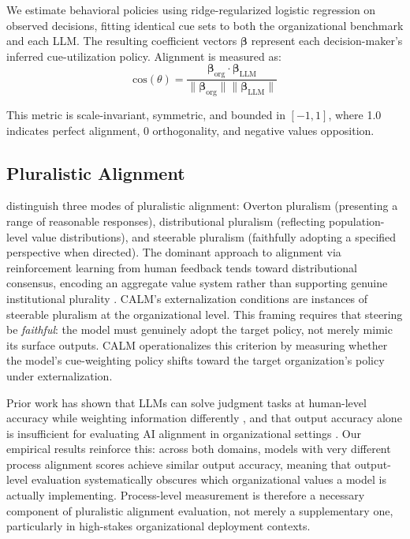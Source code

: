 \documentclass{article}
\begin{document}
We estimate behavioral policies using ridge-regularized logistic regression on observed decisions, fitting identical cue sets to both the organizational benchmark and each LLM. The resulting coefficient vectors $\boldsymbol{\beta}$ represent each decision-maker's inferred cue-utilization policy. Alignment is measured as:
\begin{equation}
  \text{cos}(\theta) = \frac{\boldsymbol{\beta}_{\text{org}} \cdot \boldsymbol{\beta}_{\text{LLM}}}{\|\boldsymbol{\beta}_{\text{org}}\| \|\boldsymbol{\beta}_{\text{LLM}}\|}
\end{equation}

This metric is scale-invariant, symmetric, and bounded in $[-1, 1]$, where 1.0 indicates perfect alignment, 0 orthogonality, and negative values opposition.

\subsection{Pluralistic Alignment}

\citet{sorensen2024roadmap} distinguish three modes of pluralistic alignment: Overton pluralism (presenting a range of reasonable responses), distributional pluralism (reflecting population-level value distributions), and steerable pluralism (faithfully adopting a specified perspective when directed). The dominant approach to alignment via reinforcement learning from human feedback \citep{ouyang2022training} tends toward distributional consensus, encoding an aggregate value system rather than supporting genuine institutional plurality \citep{gabriel2020artificial}. CALM's externalization conditions are instances of steerable pluralism at the organizational level. This framing requires that steering be \emph{faithful}: the model must genuinely adopt the target policy, not merely mimic its surface outputs. CALM operationalizes this criterion by measuring whether the model's cue-weighting policy shifts toward the target organization's policy under externalization.

Prior work has shown that LLMs can solve judgment tasks at human-level accuracy while weighting information differently \citep{binz2023using}, and that output accuracy alone is insufficient for evaluating AI alignment in organizational settings \citep{wieringa2021means,lebovitz2021ai}. Our empirical results reinforce this: across both domains, models with very different process alignment scores achieve similar output accuracy, meaning that output-level evaluation systematically obscures which organizational values a model is actually implementing. Process-level measurement is therefore a necessary component of pluralistic alignment evaluation, not merely a supplementary one, particularly in high-stakes organizational deployment contexts.
\end{document}
